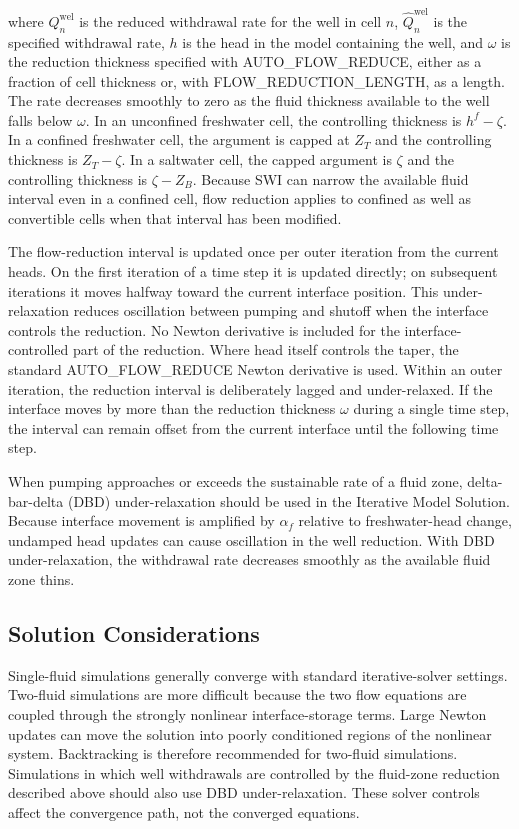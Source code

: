 \noindent where $Q_{n}^{\mathrm{wel}}$ is the reduced withdrawal rate for the well in cell $n$, $\hat Q_{n}^{\mathrm{wel}}$ is the specified withdrawal rate, $h$ is the head in the model containing the well, and $\omega$ is the reduction thickness specified with AUTO\_FLOW\_REDUCE, either as a fraction of cell thickness or, with FLOW\_REDUCTION\_LENGTH, as a length. The rate decreases smoothly to zero as the fluid thickness available to the well falls below $\omega$. In an unconfined freshwater cell, the controlling thickness is $h^{f}-\zeta$. In a confined freshwater cell, the argument is capped at $Z_{T}$ and the controlling thickness is $Z_{T}-\zeta$. In a saltwater cell, the capped argument is $\zeta$ and the controlling thickness is $\zeta-Z_{B}$. Because SWI can narrow the available fluid interval even in a confined cell, flow reduction applies to confined as well as convertible cells when that interval has been modified.

The flow-reduction interval is updated once per outer iteration from the current heads. On the first iteration of a time step it is updated directly; on subsequent iterations it moves halfway toward the current interface position. This under-relaxation reduces oscillation between pumping and shutoff when the interface controls the reduction. No Newton derivative is included for the interface-controlled part of the reduction. Where head itself controls the taper, the standard AUTO\_FLOW\_REDUCE Newton derivative is used. Within an outer iteration, the reduction interval is deliberately lagged and under-relaxed. If the interface moves by more than the reduction thickness $\omega$ during a single time step, the interval can remain offset from the current interface until the following time step.

When pumping approaches or exceeds the sustainable rate of a fluid zone, delta-bar-delta (DBD) under-relaxation should be used in the Iterative Model Solution. Because interface movement is amplified by $\alpha_{f}$ relative to freshwater-head change, undamped head updates can cause oscillation in the well reduction. With DBD under-relaxation, the withdrawal rate decreases smoothly as the available fluid zone thins.

\subsection{Solution Considerations}

Single-fluid simulations generally converge with standard iterative-solver settings. Two-fluid simulations are more difficult because the two flow equations are coupled through the strongly nonlinear interface-storage terms. Large Newton updates can move the solution into poorly conditioned regions of the nonlinear system. Backtracking is therefore recommended for two-fluid simulations. Simulations in which well withdrawals are controlled by the fluid-zone reduction described above should also use DBD under-relaxation. These solver controls affect the convergence path, not the converged equations.

